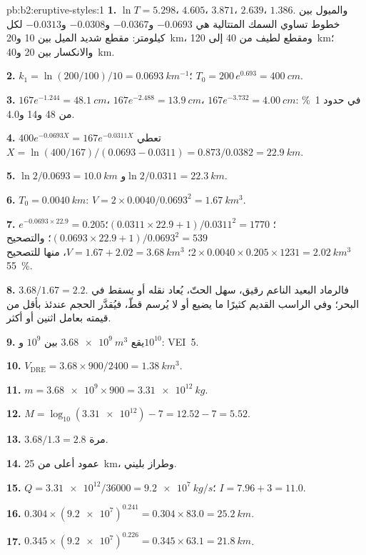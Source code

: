 \begin{solution}{pb:b2:eruptive-styles:1}
\textbf{1.} $\ln T = 5.298$، $4.605$، $3.871$، $2.639$، $1.386$. والميول بين
خطوط تساوي السمك المتتالية هي $-0.0693$ و$-0.0367$ و$-0.0308$ و$-0.0313$ لكل كيلومتر: مقطع
شديد الميل بين 10 و\qty{20}{km}، ومقطع لطيف من 40 إلى
\qty{120}{km}؛ والانكسار بين 20 و\qty{40}{km}.

\textbf{2.} $k_1 = \ln(200/100)/10 = \qty{0.0693}{km^{-1}}$؛ $T_0 = 200\,e^{0.693} =
\qty{400}{cm}$.

\textbf{3.} $167e^{-1.244} = \qty{48.1}{cm}$، $167e^{-2.488} = \qty{13.9}{cm}$،
$167e^{-3.732} = \qty{4.00}{cm}$: في حدود \qty{1}{\percent} من 48 و14 و4.0.

\textbf{4.} $400e^{-0.0693X} = 167e^{-0.0311X}$ تعطي $X = \ln(400/167)/(0.0693 -
0.0311) = 0.873/0.0382 = \qty{22.9}{km}$.

\textbf{5.} $\ln2/0.0693 = \qty{10.0}{km}$ و$\ln2/0.0311 = \qty{22.3}{km}$.

\textbf{6.} $T_0 = \qty{0.0040}{km}$: $V = 2\times0.0040/0.0693^2 =
\qty{1.67}{km^3}$.

\textbf{7.} $e^{-0.0693\times22.9} = 0.205$؛ $(0.0311\times22.9 + 1)/0.0311^2 = 1770$؛
$(0.0693\times22.9 + 1)/0.0693^2 = 539$؛ والتصحيح $2\times0.0040\times0.205\times1231 =
\qty{2.02}{km^3}$؛ $V = 1.67 + 2.02 = \qty{3.68}{km^3}$، منها للتصحيح
\qty{55}{\percent}.

\textbf{8.} $3.68/1.67 = 2.2$. فالرماد البعيد الناعم رقيق، سهل الحتّ،
يُعاد نقله أو يسقط في البحر؛ وفي الراسب القديم كثيرًا ما يضيع أو لا يُرسم
قطّ، فيُقدَّر الحجم عندئذ بأقل من قيمته بعامل اثنين أو أكثر.

\textbf{9.} يقع $\qty{3.68e9}{m^3}$ بين $10^9$ و$10^{10}$: VEI~5.

\textbf{10.} $V_{\mathrm{DRE}} = 3.68\times900/2400 = \qty{1.38}{km^3}$.

\textbf{11.} $m = \num{3.68e9}\times900 = \qty{3.31e12}{kg}$.

\textbf{12.} $M = \log_{10}(\num{3.31e12}) - 7 = 12.52 - 7 = 5.52$.

\textbf{13.} $3.68/1.3 = 2.8$ مرة.

\textbf{14.} عمود أعلى من \qty{25}{km}، وطراز بليني.

\textbf{15.} $Q = \num{3.31e12}/36000 = \qty{9.2e7}{kg/s}$؛ $I = 7.96 + 3 = 11.0$.

\textbf{16.} $0.304\times(\num{9.2e7})^{0.241} = 0.304\times83.0 = \qty{25.2}{km}$.

\textbf{17.} $0.345\times(\num{9.2e7})^{0.226} = 0.345\times63.1 = \qty{21.8}{km}$.


\end{solution}
